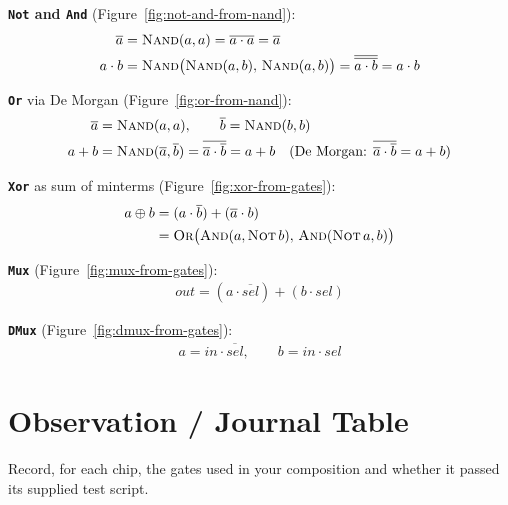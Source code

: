 \documentclass[11pt]{article}
\begin{document}
\textbf{\texttt{Not} and \texttt{And}} (Figure~\ref{fig:not-and-from-nand}):
\begin{align}
  \overline{a} &= \textsc{Nand}(a,a) = \overline{a\cdot a} = \overline{a} \nonumber\\
  a\cdot b &= \textsc{Nand}\big(\textsc{Nand}(a,b),\,\textsc{Nand}(a,b)\big)
           = \overline{\overline{a\cdot b}} = a\cdot b \nonumber
\end{align}

\textbf{\texttt{Or}} via De Morgan (Figure~\ref{fig:or-from-nand}):
\begin{align}
  \overline{a} &= \textsc{Nand}(a,a),\qquad \overline{b} = \textsc{Nand}(b,b) \nonumber\\
  a+b &= \textsc{Nand}(\overline{a},\overline{b}) = \overline{\overline{a}\cdot\overline{b}}
       = a+b \quad\text{(De Morgan: }\overline{\overline{a}\cdot\overline{b}} = a+b\text{)} \nonumber
\end{align}

\textbf{\texttt{Xor}} as sum of minterms (Figure~\ref{fig:xor-from-gates}):
\begin{align}
  a\oplus b &= (a\cdot\overline{b}) + (\overline{a}\cdot b) \nonumber\\
            &= \textsc{Or}\big(\textsc{And}(a,\textsc{Not}\, b),\,\textsc{And}(\textsc{Not}\, a, b)\big) \nonumber
\end{align}

\textbf{\texttt{Mux}} (Figure~\ref{fig:mux-from-gates}):
\begin{align}
  out = (a\cdot\overline{sel}) + (b\cdot sel) \nonumber
\end{align}

\textbf{\texttt{DMux}} (Figure~\ref{fig:dmux-from-gates}):
\begin{align}
  a = in\cdot\overline{sel},\qquad b = in\cdot sel \nonumber
\end{align}

\section{Observation / Journal Table}

Record, for each chip, the gates used in your composition and whether it passed its supplied test script.
\end{document}

